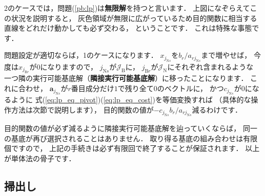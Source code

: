﻿\documentclass[a4paper]{jsarticle}
\begin{document}
2のケースでは，問題(\ref{pb:lp})は{\bf 無限解}を持つと言います．
上図になぞらえてこの状況を説明すると，
灰色領域が無限に広がっているため目的関数に相当する直線をどれだけ動かしても必ず交わる，
ということです．
これは特殊な事態です．

問題設定が適切ならば，1のケースになります．
$x_{j_{\mathrm{N}s}}$を$b_{r}/a_{rj_{\mathrm{N}s}}$まで増やせば，
今度は$x_{j_{\mathrm{B}r}}$が$0$になりますので，
$j_{\mathrm{N}s}$が$\mathcal{J}_{\mathrm{B}}$に，
$j_{\mathrm{B}r}$が$\mathcal{J}_{\mathrm{N}}$にそれぞれ含まれるような
一つ隣の実行可能基底解（{\bf 隣接実行可能基底解}）に移ったことになります．
これに合わせ，
$\boldsymbol{a}_{j_{\mathrm{N}s}}$が$r$番目成分だけ$1$で残り全て$0$のベクトルに，
かつ$c_{j_{\mathrm{N}s}}$が$0$になるように
式(\ref{eq:lp_eq_pivot})(\ref{eq:lp_eq_cost})を等価変換すれば
（具体的な操作方法は次節で説明します），
目的関数の値が$-c_{j_{\mathrm{N}s}}b_{r}/a_{rj_{\mathrm{N}s}}$減るわけです．

目的関数の値が必ず減るように隣接実行可能基底解を辿っていくならば，
同一の基底が再び選択されることはありません．
取り得る基底の組み合わせは有限個ですので，
上記の手続きは必ず有限回で終了することが保証されます．
以上が単体法の骨子です．

\subsection{掃出し}
\end{document}
